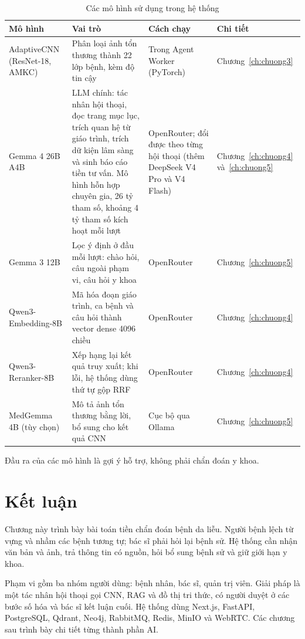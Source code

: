 \begin{table}[H]
\centering
\caption{Các mô hình sử dụng trong hệ thống}
\label{tab:cac-mo-hinh}
\small
\begin{tabular}{|p{3.9cm}|p{5.1cm}|p{2.9cm}|p{2.3cm}|}
\hline
\textbf{Mô hình} & \textbf{Vai trò} & \textbf{Cách chạy} & \textbf{Chi tiết} \\ \hline
AdaptiveCNN (ResNet-18, AMKC) & Phân loại ảnh tổn thương thành 22 lớp bệnh, kèm độ tin cậy & Trong Agent Worker (PyTorch) & Chương~\ref{ch:chuong3} \\ \hline
Gemma 4 26B A4B & LLM chính: tác nhân hội thoại, đọc trang mục lục, trích quan hệ từ giáo trình, trích dữ kiện lâm sàng và sinh báo cáo tiền tư vấn. Mô hình hỗn hợp chuyên gia, 26 tỷ tham số, khoảng 4 tỷ tham số kích hoạt mỗi lượt & OpenRouter; đổi được theo từng hội thoại (thêm DeepSeek V4 Pro và V4 Flash) & Chương~\ref{ch:chuong4} và~\ref{ch:chuong5} \\ \hline
Gemma 3 12B & Lọc ý định ở đầu mỗi lượt: chào hỏi, câu ngoài phạm vi, câu hỏi y khoa & OpenRouter & Chương~\ref{ch:chuong5} \\ \hline
Qwen3-Embedding-8B & Mã hóa đoạn giáo trình, ca bệnh và câu hỏi thành vector dense 4096 chiều & OpenRouter & Chương~\ref{ch:chuong4} \\ \hline
Qwen3-Reranker-8B & Xếp hạng lại kết quả truy xuất; khi lỗi, hệ thống dùng thứ tự gộp RRF & OpenRouter & Chương~\ref{ch:chuong4} \\ \hline
MedGemma 4B (tùy chọn) & Mô tả ảnh tổn thương bằng lời, bổ sung cho kết quả CNN & Cục bộ qua Ollama & Chương~\ref{ch:chuong5} \\ \hline
\end{tabular}
\end{table}

Đầu ra của các mô hình là gợi ý hỗ trợ, không phải chẩn đoán y khoa.

\section{Kết luận}

Chương này trình bày bài toán tiền chẩn đoán bệnh da liễu. Người bệnh lệch từ vựng và nhầm các bệnh tương tự; bác sĩ phải hỏi lại bệnh sử. Hệ thống cần nhận văn bản và ảnh, trả thông tin có nguồn, hỏi bổ sung bệnh sử và giữ giới hạn y khoa.

Phạm vi gồm ba nhóm người dùng: bệnh nhân, bác sĩ, quản trị viên. Giải pháp là một tác nhân hội thoại gọi CNN, RAG và đồ thị tri thức, có người duyệt ở các bước số hóa và bác sĩ kết luận cuối. Hệ thống dùng Next.js, FastAPI, PostgreSQL, Qdrant, Neo4j, RabbitMQ, Redis, MinIO và WebRTC. Các chương sau trình bày chi tiết từng thành phần AI.
